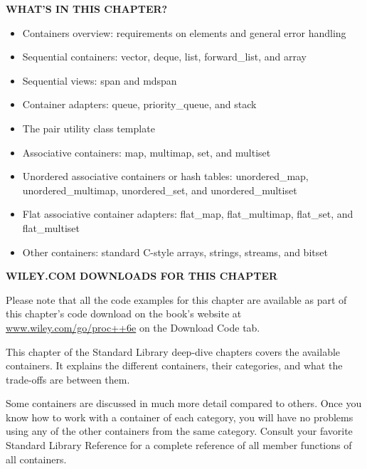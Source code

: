 \noindent
\textbf{WHAT’S IN THIS CHAPTER?}

\begin{itemize}
\item
Containers overview: requirements on elements and general error handling

\item
Sequential containers: vector, deque, list, forward\_list, and array

\item
Sequential views: span and mdspan

\item
Container adapters: queue, priority\_queue, and stack

\item
The pair utility class template

\item
Associative containers: map, multimap, set, and multiset

\item
Unordered associative containers or hash tables: unordered\_map, unordered\_multimap, unordered\_set, and unordered\_multiset

\item
Flat associative container adapters: flat\_map, flat\_multimap, flat\_set, and flat\_multiset

\item
Other containers: standard C-style arrays, strings, streams, and bitset
\end{itemize}

\noindent
\textbf{WILEY.COM DOWNLOADS FOR THIS CHAPTER}

Please note that all the code examples for this chapter are available as part of this chapter’s code download on the book’s website at \url{www.wiley.com/go/proc++6e} on the Download Code tab.

This chapter of the Standard Library deep-dive chapters covers the available containers. It explains the different containers, their categories, and what the trade-offs are between them.

Some containers are discussed in much more detail compared to others. Once you know how to work with a container of each category, you will have no problems using any of the other containers from the same category. Consult your favorite Standard Library Reference for a complete reference of all member functions of all containers.